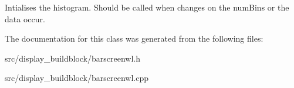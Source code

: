 Intialises the histogram. Should be called when changes on the num\+Bins or the data occur. 

The documentation for this class was generated from the following files\+:\begin{DoxyCompactItemize}
\item 
src/display\+\_\+buildblock/barscreenwl.\+h\item 
src/display\+\_\+buildblock/barscreenwl.\+cpp\end{DoxyCompactItemize}
